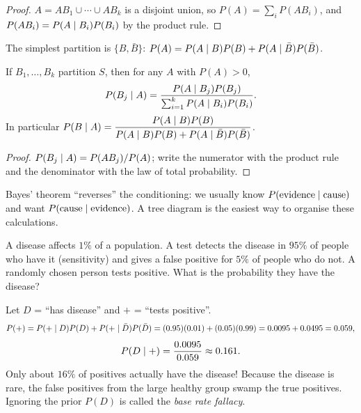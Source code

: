 \begin{proof}
$A = AB_1 \cup \cdots \cup AB_k$ is a disjoint union, so $P(A) = \sum_i P(AB_i)$, and
$P(AB_i) = P(A\mid B_i)P(B_i)$ by the product rule.
\end{proof}

The simplest partition is $\{B, \bar B\}$:
$P(A) = P(A\mid B)P(B) + P(A\mid \bar B)P(\bar B)$.

\begin{theorem}
If $B_1,\dots,B_k$ partition $S$, then for any $A$ with $P(A)>0$,
\[
  P(B_j\mid A) = \frac{P(A\mid B_j)P(B_j)}{\sum_{i=1}^k P(A\mid B_i)P(B_i)}.
\]
In particular $P(B\mid A) = \dfrac{P(A\mid B)P(B)}{P(A\mid B)P(B) + P(A\mid\bar B)P(\bar B)}$.
\end{theorem}

\begin{proof}
$P(B_j\mid A) = P(AB_j)/P(A)$; write the numerator with the product rule and the
denominator with the law of total probability.
\end{proof}

Bayes' theorem ``reverses'' the conditioning: we usually know $P(\text{evidence}\mid
\text{cause})$ and want $P(\text{cause}\mid\text{evidence})$. A tree diagram is the
easiest way to organise these calculations.

\begin{example}
A disease affects $1\%$ of a population. A test detects the disease in $95\%$ of people
who have it (sensitivity) and gives a false positive for $5\%$ of people who do not. A
randomly chosen person tests positive. What is the probability they have the disease?

Let $D$ = ``has disease'' and $+$ = ``tests positive''.
\[
  P(+) = P(+\mid D)P(D) + P(+\mid\bar D)P(\bar D) = (0.95)(0.01) + (0.05)(0.99)
  = 0.0095 + 0.0495 = 0.059,
\]
\[
  P(D\mid +) = \frac{0.0095}{0.059} \approx 0.161.
\]
Only about $16\%$ of positives actually have the disease! Because the disease is rare, the
false positives from the large healthy group swamp the true positives. Ignoring the
prior $P(D)$ is called the \emph{base rate fallacy}.
\end{example}

\begin{center}
\end{center}

